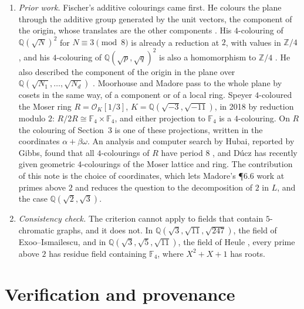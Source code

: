 \documentclass[11pt,a4paper]{amsart}
\theoremstyle{remark}
\newcommand{\F}{\mathbb{F}}
\newcommand{\Q}{\mathbb{Q}}
\newcommand{\Z}{\mathbb{Z}}
\begin{document}
\begin{enumerate}
\item \emph{Prior work.} Fischer's additive colourings \cite{Fischer1990,Fischer1994} came first. He colours the
plane through the additive group generated by the unit vectors, the component of the origin, whose translates
are the other components \cite[Thm.~1]{Fischer1990}. His $4$-colouring of $\Q(\sqrt N)^2$ for $N\equiv3\pmod 8$
is already a reduction at $2$, with values in $\Z/4$ \cite[Thm.~10]{Fischer1990}, and his $4$-colouring of
$\Q(\sqrt p,\sqrt q)^2$ is also a homomorphism to $\Z/4$ \cite{Fischer1994}. He also described the component of
the origin in the plane over $\Q(\sqrt{N_1},\dots,\sqrt{N_d})$ \cite{Fischer1990b}. Moorhouse
\cite[Lemma~4.2]{Moorhouse} and Madore \cite[Prop.~3.2]{Madore} pass to the whole plane by cosets in the same
way, of a component or of a local ring. Speyer \cite{Polymath2} $4$-coloured the Moser ring
$R=\mathcal{O}_K[1/3]$, $K=\Q(\sqrt{-3},\sqrt{-11})$, in 2018 by reduction modulo $2$:
$R/2R\cong\F_4\times\F_4$, and either projection to $\F_4$ is a $4$-colouring. On $R$ the colouring of
Section~3 is one of these projections, written in the coordinates $\alpha+\beta\omega$. An analysis and computer
search by Hubai, reported by Gibbs, found that all $4$-colourings of $R$ have period $8$ \cite{Polymath3}, and
D\'ucz \cite{Ducz} has recently given geometric $4$-colourings of the Moser lattice and ring. The contribution of
this note is the choice of coordinates, which lets Madore's \P6.6 work at primes above $2$ and reduces the
question to the decomposition of $2$ in $L$, and the case $\Q(\sqrt2,\sqrt3)$.
\item \emph{Consistency check.} The criterion cannot apply to fields that contain $5$-chromatic graphs, and it
does not. In $\Q(\sqrt3,\sqrt{11},\sqrt{247})$, the field of Exoo--Ismailescu, and in
$\Q(\sqrt3,\sqrt5,\sqrt{11})$, the field of Heule \cite{Heule}, every prime above $2$ has residue field
containing $\F_4$, where $X^2+X+1$ has roots.
\end{enumerate}

\section{Verification and provenance}\label{sec:verification}
\end{document}
